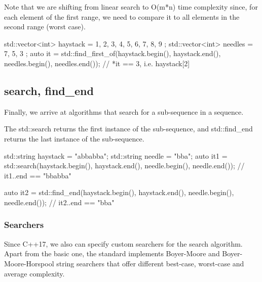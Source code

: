 
Note that we are shifting from linear search to O(m*n) time complexity since, for each element of the first range, we need to compare it to all elements in the second range (worst case).

\begin{box-note}
\begin{cppcode}
std::vector<int> haystack = { 1, 2, 3, 4, 5, 6, 7, 8, 9 };
std::vector<int> needles = { 7, 5, 3 };
auto it = std::find_first_of(haystack.begin(), haystack.end(), 
                             needles.begin(), needles.end());
// *it == 3, i.e. haystack[2]
\end{cppcode}
\end{box-note}

\subsection{search, find\_end}

Finally, we arrive at algorithms that search for a sub-sequence in a sequence.



The std::search returns the first instance of the sub-sequence, and std::find\_end returns the last instance of the sub-sequence.

\begin{box-note}
\begin{cppcode}
std::string haystack = "abbabba";
std::string needle = "bba";
auto it1 = std::search(haystack.begin(), haystack.end(), 
                       needle.begin(), needle.end());
// it1..end == "bbabba"

auto it2 = std::find_end(haystack.begin(), haystack.end(), 
                         needle.begin(), needle.end());
// it2..end == "bba"
\end{cppcode}
\end{box-note}

\subsubsection{Searchers}

Since C++17, we also can specify custom searchers for the search algorithm. Apart from the basic one, the standard implements Boyer-Moore and Boyer-Moore-Horspool string searchers that offer different best-case, worst-case and average complexity.

